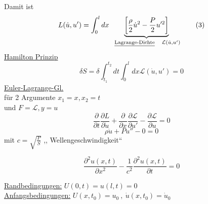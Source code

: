 \documentclass[titlepage,12pt,a4paper,ngerman]{report}
\newcommand{\tx}[1]{\textrm{#1}}
\newcommand{\ub}[1]{\underbrace{#1}}
\newcommand{\frbox}[2]{\begin{tcolorbox}[colback=white,colframe=red!75!black,fonttitle=\bfseries,title=#1]#2\end{tcolorbox}} %
\begin{document}
Damit ist
\begin{equation*}
L(\dot{u},u') = \int_{0}^{l} dx \ \ub{\bigg[ \frac{\rho}{2} \dot{u}^2 - \frac{P}{2} u'^2\bigg]}_{\tx{ \underline{Lagrange-Dichte}} \quad \mathcal{L} (\dot{u},u') } \tag{3}
\end{equation*}
\underline{Hamilton Prinzip}
$$ \delta S = \delta \int_{t_1}^{t_2} dt \int_{0}^{l} dx \mathcal{L} (\dot{u},u') = 0$$
\underline{Euler-Lagrange-Gl.}\\
für 2 Argumente $ x_1 = x, x_2 = t $\\
und $ F = \mathcal{L}, y = u $
$$\frac{\partial}{\partial t} \frac{\partial L}{\partial \dot{u}} + \frac{\partial}{\partial x} \frac{\partial \mathcal{L}}{\partial u'} - \frac{\partial \mathcal{L}}{\partial u} = 0 $$
$$ \rho \ddot{u} + P u'' - 0 = 0 $$
mit $ c = \sqrt{\frac{P}{S}} $ ,, Wellengeschwindigkeit``\\
\frbox{Wellengleichung}{$$\frac{\partial^2 u(x,t)}{\partial x^2} - \frac{1}{c^2} \frac{\partial^2 u(x,t)}{\partial t} = 0 $$}
\noindent
\underline{Randbedingungen:} $  U(0,t) = u(l,t) = 0 $\\
\underline{Anfangsbedingungen:} $ U(x,t_0) = u_0\ , \ \dot{u}(x,t_0) = \dot{u}_0 $\\
\end{document}
